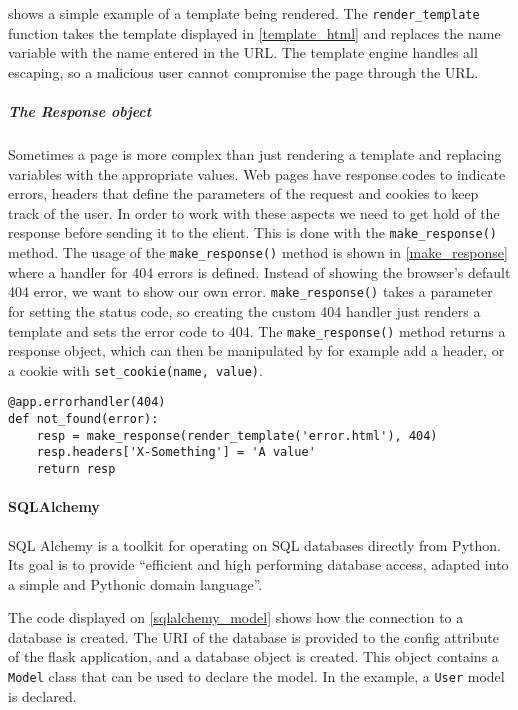  shows a simple example of a template being rendered.
The \texttt{render\_template} function takes the template displayed in \cref{template_html} and replaces the name variable with the name entered in the URL.
The template engine handles all escaping, so a malicious user cannot compromise the page through the URL.

\subparagraph{The Response object}
Sometimes a page is more complex than just rendering a template and replacing variables with the appropriate values.
Web pages have response codes to indicate errors, headers that define the parameters of the request and cookies to keep track of the user.
In order to work with these aspects we need to get hold of the response before sending it to the client.
This is done with the \texttt{make\_response()} method.
The usage of the \texttt{make\_response()} method is shown in \cref{make_response} where a handler for 404 errors is defined.
Instead of showing the browser's default 404 error, we want to show our own error.
\texttt{make\_response()} takes a parameter for setting the status code, so creating the custom 404 handler just renders a template and sets the error code to 404.
The \texttt{make\_response()} method returns a response object, which can then be manipulated by for example add a header, or a cookie with \texttt{set\_cookie(name, value)}.

\begin{lstlisting}[style=python, caption='Using make\_response to create a custom 404 handler', label=make_response]
@app.errorhandler(404)
def not_found(error):
    resp = make_response(render_template('error.html'), 404)
    resp.headers['X-Something'] = 'A value'
    return resp
\end{lstlisting}

\paragraph{SQLAlchemy}
SQL Alchemy is a toolkit for operating on SQL databases directly from Python.
Its goal is to provide ``efficient and high performing database access, adapted into a simple and Pythonic domain language''\citep{sqlalchemy_official}.

The code displayed on \cref{sqlalchemy_model} shows how the connection to a database is created.
The URI of the database is provided to the config attribute of the flask application, and a database object is created.
This object contains a \texttt{Model} class that can be used to declare the model.
In the example, a \texttt{User} model is declared.

